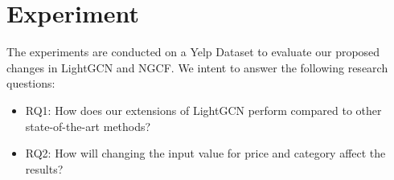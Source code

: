 \section{Experiment}
The experiments are conducted on a Yelp Dataset to evaluate our proposed changes in LightGCN and NGCF.
We intent to answer the following research questions:
\begin{itemize}
    \item RQ1: How does our extensions of LightGCN perform compared to other state-of-the-art methods?
    \item RQ2: How will changing the input value for price and category affect the results?
\end{itemize}




